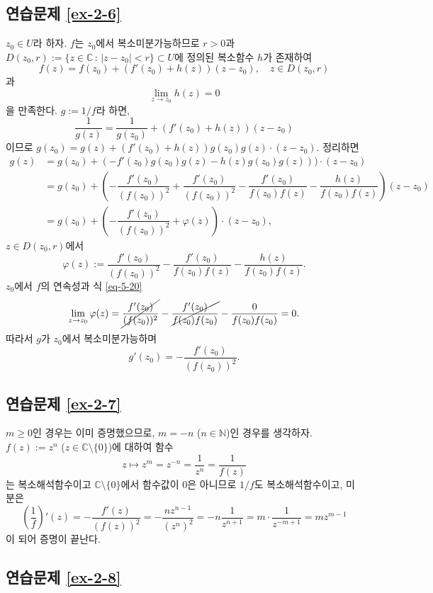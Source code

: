 \subsection*{연습문제 \ref{ex-2-6}}

$z_0\in U$라 하자. $f$는 $z_0$에서 복소미분가능하므로
$r>0$과 $D(z_0,r) := \{ z\in \mathbb C\,:\, |z-z_0|<r\} \subset U$에 정의된
복소함수 $h$가 존재하여
\[
f(z) = f(z_0) + (f'(z_0) +h(z))(z-z_0),
\quad z\in D(z_0,r)
\]
과
\begin{equation}\label{eq-5-20}
\lim_{z\to z_0} h(z)=0
\end{equation}
을 만족한다.
$g:=1/f$라 하면,
\[
\dfrac1{g(z)} = \dfrac1{g(z_0)} + (f'(z_0) +h(z))(z-z_0)
\]
이므로 $g(z_0) = g(z) + (f'(z_0)+h(z))g(z_0)g(z)\cdot(z-z_0)$.
정리하면
\begin{align*}
g(z) &= g(z_0) + (-f'(z_0)g(z_0)g(z) - h(z)g(z_0)g(z)))\cdot(z-z_0) \\
&= g(z_0) + \left( - \dfrac{f'(z_0)}{(f(z_0))^2} + \dfrac{f'(z_0)}{(f(z_0))^2}
- \dfrac{f'(z_0)}{f(z_0)f(z)} - \dfrac{h(z)}{f(z_0)f(z)} \right) (z-z_0) \\
&= g(z_0) + \left( - \dfrac{f'(z_0)}{(f(z_0))^2} + \varphi(z) \right)\cdot(z-z_0),
\end{align*}
$z\in D(z_0,r)$에서
\[
\varphi(z):= \dfrac{f'(z_0)}{(f(z_0))^2}
- \dfrac{f'(z_0)}{f(z_0)f(z)} - \dfrac{h(z)}{f(z_0)f(z)}.
\]
$z_0$에서 $f$의 연속성과 식 \eqref{eq-5-20}
\[
\lim_{z\to z_0} \varphi(z) = \cancel{\dfrac{f'(z_0)}{(f(z_0))^2}}
- \cancel{\dfrac{f'(z_0)}{f(z_0)f(z_0)}} - \dfrac{0}{f(z_0)f(z_0)} = 0.
\]
따라서 $g$가 $z_0$에서 복소미분가능하며
\[
g'(z_0) = - \dfrac{f'(z_0)}{(f(z_0))^2}.
\]

\subsection*{연습문제 \ref{ex-2-7}}

$m\ge0$인 경우는 이미 증명했으므로, 
$m= -n$ ($n\in \mathbb N$)인 경우를 생각하자.
$f(z):=z^n$ ($z\in \mathbb C\setminus \{0\}$)에  대하여 함수
\[
z\mapsto z^m = z^{-n} = \dfrac1{z^n} = \dfrac1{f(z)}
\]
는 복소해석함수이고 $\mathbb C\setminus \{0\}$에서 함수값이
$0$은 아니므로
$1/f$도 복소해석함수이고, 미분은
\[
\left(\dfrac1f\right)'(z) = - \dfrac{f'(z)}{(f(z))^2} = - \dfrac{nz^{n-1}}{(z^n)^2}
= -n \dfrac1{z^{n+1}} = m \cdot \dfrac1{z^{-m+1}} = mz^{m-1}
\]
이 되어 증명이 끝난다.

\subsection*{연습문제 \ref{ex-2-8}}

